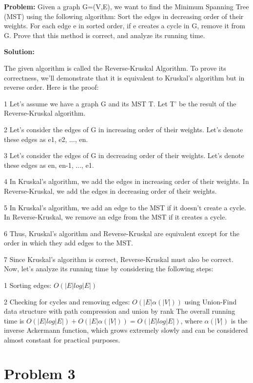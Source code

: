 \documentclass[11pt]{article}
\begin{document}
    \textbf{Problem:} Given a graph G=(V,E), we want to find the Minimum Spanning Tree (MST) using the following algorithm: Sort the edges in decreasing order of their weights. For each edge e in sorted order, if e creates a cycle in G, remove it from G. Prove that this method is correct, and analyze its running time.

    \textbf{Solution:}

    The given algorithm is called the Reverse-Kruskal Algorithm. To prove its correctness, we'll demonstrate that it is equivalent to Kruskal's algorithm but in reverse order. Here is the proof:

    \itemize
    \item[1] Let's assume we have a graph G and its MST T. Let T' be the result of the Reverse-Kruskal algorithm.
    \item[2] Let's consider the edges of G in increasing order of their weights. Let's denote these edges as e1, e2, ..., en.
    \item[3] Let's consider the edges of G in decreasing order of their weights. Let's denote these edges as en, en-1, ..., e1.
    \item[4] In Kruskal's algorithm, we add the edges in increasing order of their weights. In Reverse-Kruskal, we add the edges in decreasing order of their weights.
    \item[5] In Kruskal's algorithm, we add an edge to the MST if it doesn't create a cycle. In Reverse-Kruskal, we remove an edge from the MST if it creates a cycle.
    \item[6] Thus, Kruskal's algorithm and Reverse-Kruskal are equivalent except for the order in which they add edges to the MST.
    \item[7] Since Kruskal's algorithm is correct, Reverse-Kruskal must also be correct.
    \enditemize
    Now, let's analyze its running time by considering the following steps:

    \itemize
    \item[1]Sorting edges: $O(|E| log |E|)$
    \item[2]Checking for cycles and removing edges: $O(|E| \alpha(|V|))$ using Union-Find data structure with path compression and union by rank
    \enditemize
    The overall running time is $O(|E| log |E|) + O(|E| \alpha(|V|)) = O(|E| log |E|)$, where $\alpha(|V|)$ is the inverse Ackermann function, which grows extremely slowly and can be considered almost constant for practical purposes.


    \section{Problem 3}
\end{document}
